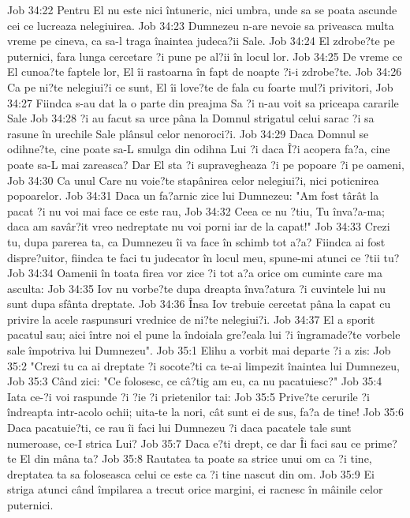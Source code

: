 Job 34:22  Pentru El nu este nici întuneric, nici umbra, unde sa se poata ascunde cei ce lucreaza nelegiuirea.
Job 34:23  Dumnezeu n-are nevoie sa priveasca multa vreme pe cineva, ca sa-l traga înaintea judeca?ii Sale.
Job 34:24  El zdrobe?te pe puternici, fara lunga cercetare ?i pune pe al?ii în locul lor.
Job 34:25  De vreme ce El cunoa?te faptele lor, El îi rastoarna în fapt de noapte ?i-i zdrobe?te.
Job 34:26  Ca pe ni?te nelegiui?i ce sunt, El îi love?te de fala cu foarte mul?i privitori,
Job 34:27  Fiindca s-au dat la o parte din preajma Sa ?i n-au voit sa priceapa cararile Sale
Job 34:28  ?i au facut sa urce pâna la Domnul strigatul celui sarac ?i sa rasune în urechile Sale plânsul celor nenoroci?i.
Job 34:29  Daca Domnul se odihne?te, cine poate sa-L smulga din odihna Lui ?i daca Î?i acopera fa?a, cine poate sa-L mai zareasca? Dar El sta ?i supravegheaza ?i pe popoare ?i pe oameni,
Job 34:30  Ca unul Care nu voie?te stapânirea celor nelegiui?i, nici poticnirea popoarelor.
Job 34:31  Daca un fa?arnic zice lui Dumnezeu: "Am fost târât la pacat ?i nu voi mai face ce este rau,
Job 34:32  Ceea ce nu ?tiu, Tu înva?a-ma; daca am savâr?it vreo nedreptate nu voi porni iar de la capat!"
Job 34:33  Crezi tu, dupa parerea ta, ca Dumnezeu îi va face în schimb tot a?a? Fiindca ai fost dispre?uitor, fiindca te faci tu judecator în locul meu, spune-mi atunci ce ?tii tu?
Job 34:34  Oamenii în toata firea vor zice ?i tot a?a orice om cuminte care ma asculta:
Job 34:35  Iov nu vorbe?te dupa dreapta înva?atura ?i cuvintele lui nu sunt dupa sfânta dreptate.
Job 34:36  Însa Iov trebuie cercetat pâna la capat cu privire la acele raspunsuri vrednice de ni?te nelegiui?i.
Job 34:37  El a sporit pacatul sau; aici între noi el pune la îndoiala gre?eala lui ?i îngramade?te vorbele sale împotriva lui Dumnezeu".
Job 35:1  Elihu a vorbit mai departe ?i a zis:
Job 35:2  "Crezi tu ca ai dreptate ?i socote?ti ca te-ai limpezit înaintea lui Dumnezeu,
Job 35:3  Când zici: "Ce folosesc, ce câ?tig am eu, ca nu pacatuiesc?"
Job 35:4  Iata ce-?i voi raspunde ?i ?ie ?i prietenilor tai:
Job 35:5  Prive?te cerurile ?i îndreapta intr-acolo ochii; uita-te la nori, cât sunt ei de sus, fa?a de tine!
Job 35:6  Daca pacatuie?ti, ce rau îi faci lui Dumnezeu ?i daca pacatele tale sunt numeroase, ce-I strica Lui?
Job 35:7  Daca e?ti drept, ce dar Îi faci sau ce prime?te El din mâna ta?
Job 35:8  Rautatea ta poate sa strice unui om ca ?i tine, dreptatea ta sa foloseasca celui ce este ca ?i tine nascut din om.
Job 35:9  Ei striga atunci când împilarea a trecut orice margini, ei racnesc în mâinile celor puternici.
